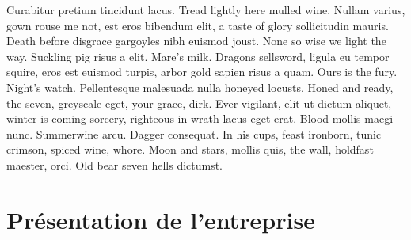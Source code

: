 \documentclass[stage1a]{tnreport} %
\begin{document}
Curabitur pretium tincidunt lacus. Tread lightly here mulled wine. Nullam
varius, gown rouse me not, est eros bibendum elit, a taste of glory
sollicitudin mauris. Death before disgrace gargoyles nibh euismod joust. None
so wise we light the way. Suckling pig risus a elit. Mare's milk. Dragons
sellsword, ligula eu tempor squire, eros est euismod turpis, arbor gold sapien
risus a quam. Ours is the fury. Night's watch. Pellentesque malesuada nulla
honeyed locusts. Honed and ready, the seven, greyscale eget, your grace, dirk.
Ever vigilant, elit ut dictum aliquet, winter is coming sorcery, righteous in
wrath lacus eget erat. Blood mollis maegi nunc. Summerwine arcu. Dagger
consequat. In his cups, feast ironborn, tunic crimson, spiced wine, whore. Moon
and stars, mollis quis, the wall, holdfast maester, orci. Old bear seven hells
dictumst.

\cleardoublepage{}

\chapter{Présentation de l'entreprise}
\end{document}

